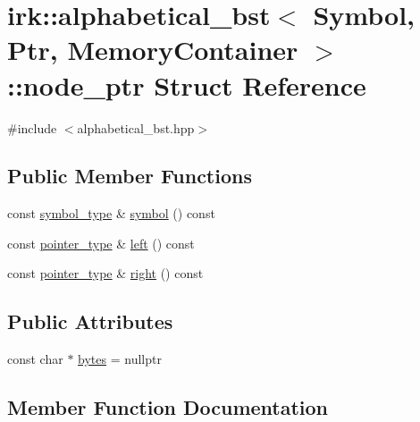 \hypertarget{structirk_1_1alphabetical__bst_1_1node__ptr}{}\section{irk\+:\+:alphabetical\+\_\+bst$<$ Symbol, Ptr, Memory\+Container $>$\+:\+:node\+\_\+ptr Struct Reference}
\label{structirk_1_1alphabetical__bst_1_1node__ptr}


{\ttfamily \#include $<$alphabetical\+\_\+bst.\+hpp$>$}

\subsection*{Public Member Functions}
\begin{DoxyCompactItemize}
\item 
const \mbox{\hyperlink{classirk_1_1alphabetical__bst_a296ccb8fa9fa9dce3b3c3beab0a5ca28}{symbol\+\_\+type}} \& \mbox{\hyperlink{structirk_1_1alphabetical__bst_1_1node__ptr_a8a8eaa5ac49c5c7b19e3dd1d416a023b}{symbol}} () const
\item 
const \mbox{\hyperlink{classirk_1_1alphabetical__bst_ae689c05ab96a71769e24908d5c73765c}{pointer\+\_\+type}} \& \mbox{\hyperlink{structirk_1_1alphabetical__bst_1_1node__ptr_ab55156d17cd292c4748e6000b3edb205}{left}} () const
\item 
const \mbox{\hyperlink{classirk_1_1alphabetical__bst_ae689c05ab96a71769e24908d5c73765c}{pointer\+\_\+type}} \& \mbox{\hyperlink{structirk_1_1alphabetical__bst_1_1node__ptr_a11bac9c1ab6dc6a2b395a02c334bd535}{right}} () const
\end{DoxyCompactItemize}
\subsection*{Public Attributes}
\begin{DoxyCompactItemize}
\item 
const char $\ast$ \mbox{\hyperlink{structirk_1_1alphabetical__bst_1_1node__ptr_afc089ea68fd618ec88d8acb2556d49e8}{bytes}} = nullptr
\end{DoxyCompactItemize}


\subsection{Member Function Documentation}
\mbox{\label{structirk_1_1alphabetical__bst_1_1node__ptr_ab55156d17cd292c4748e6000b3edb205}} 
